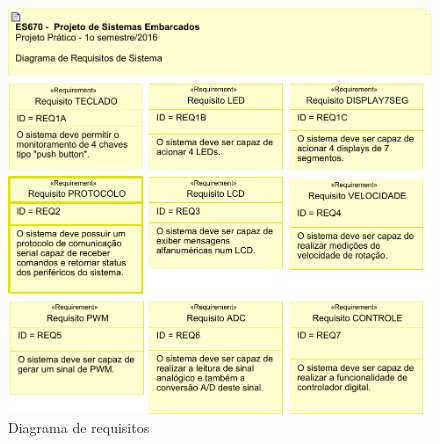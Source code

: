 \documentclass{article}
\begin{document}
\begin{figure}[H]
	\centering
	\includegraphics[width=0.9\linewidth]{requisitos}
	\caption{Diagrama de requisitos}
	\label{fig:requisitos}
\end{figure}
\end{document}
